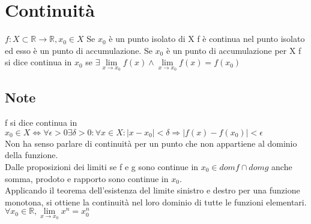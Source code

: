 \chapter{Continuit\`a}
$f: X\subset\mathbb{R}\rightarrow\mathbb{R}, x_0\in X$ Se $x_0$ \`e un punto isolato di X f \`e continua nel punto isolato ed esso \`e un punto di accumulazione. Se $x_0$ \`e un punto di accumulazione per X f si dice continua in $x_0$ se $\exists \lim\limits_{x\rightarrow x_0} f(x)\wedge\lim\limits_{x\rightarrow x_0} f(x)=f(x_0)$
\section{Note}
f si dice continua in $x_0\in X \Leftrightarrow\forall\epsilon>0\exists\delta>0 :\forall x\in X:|x-x_0|<\delta \Rightarrow |f(x)-f(x_0)|<\epsilon$\\
Non ha senso parlare di continuit\`a per un punto che non appartiene al dominio della funzione.\\
Dalle proposizioni dei limiti se f e g sono continue in $x_0\in domf\cap domg$ anche somma, prodoto e rapporto sono continue in $x_0$.\\
Applicando il teorema dell'esistenza del limite sinistro e destro per una funzione monotona, si ottiene la continuit\`a nel loro dominio di tutte le funzioni elementari.\\
$\forall x_0\in\mathbb{R},\lim\limits_{x\rightarrow x_0} x^n=x_0^n$
